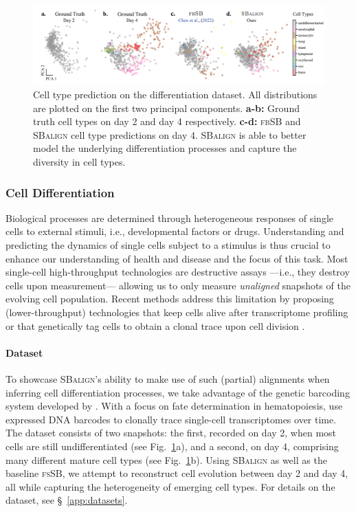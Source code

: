 \begin{figure}[t]
    \centering
    \includegraphics[width=\textwidth]{figures/fig_cell_pred_types.pdf}
    \caption{Cell type prediction on the differentiation dataset. All distributions are plotted on the first two principal components. \textbf{a-b:} Ground truth cell types on day 2 and day 4 respectively. \textbf{c-d:} \textsc{fbSB} and \textsc{SBalign} cell type predictions on day 4. \textsc{SBalign} is able to better model the underlying differentiation processes and capture the diversity in cell types.}
    \label{fig:results_cell_class}
\end{figure}

\subsubsection{Cell Differentiation}
\label{sec:cell}

 Biological processes are determined through heterogeneous responses of single cells to external stimuli, i.e., developmental factors or drugs. Understanding and predicting the dynamics of single cells subject to a stimulus is thus crucial to enhance our understanding of health and disease and the focus of this task.
Most single-cell high-throughput technologies are destructive assays ---i.e., they destroy cells upon measurement--- allowing us to only measure \textit{unaligned} snapshots of the evolving cell population. Recent methods address this limitation by proposing (lower-throughput) technologies that keep cells alive after transcriptome profiling \citep{chen2022live} or that genetically tag cells to obtain a clonal trace upon cell division \citep{weinreb2020lineage}.

\paragraph{Dataset} To showcase \textsc{SBalign}'s ability to make use of such (partial) alignments when inferring cell differentiation processes, we take advantage of the genetic barcoding system developed by \citet{weinreb2020lineage}. With a focus on fate determination in hematopoiesis, \citet{weinreb2020lineage} use expressed DNA barcodes to clonally trace single-cell transcriptomes over time. The dataset consists of two snapshots: the first, recorded on day 2, when most cells are still undifferentiated (see Fig.~\ref{fig:results_cell_class}a), and a second, on day 4, comprising many different mature cell types (see Fig.~\ref{fig:results_cell_class}b). Using \textsc{SBalign} as well as the baseline \textsc{fsSB}, we attempt to reconstruct cell evolution between day 2 and day 4, all while capturing the heterogeneity of emerging cell types. For details on the dataset, see \S~\ref{app:datasets}.

